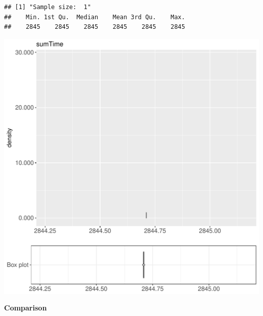 \documentclass{article}\usepackage[]{graphicx}\usepackage[]{color}
\makeatletter
\def\maxwidth{ %
  \ifdim\Gin@nat@width>\linewidth
    \linewidth
  \else
    \Gin@nat@width
  \fi
}
\newenvironment{kframe}{%
 \def\at@end@of@kframe{}%
 \ifinner\ifhmode%
  \def\at@end@of@kframe{\end{minipage}}%
  \begin{minipage}{\columnwidth}%
 \fi\fi%
 \def\FrameCommand##1{\hskip\@totalleftmargin \hskip-\fboxsep
 \colorbox{shadecolor}{##1}\hskip-\fboxsep
     \hskip-\linewidth \hskip-\@totalleftmargin \hskip\columnwidth}%
 \MakeFramed {\advance\hsize-\width
   \@totalleftmargin\z@ \linewidth\hsize
   \@setminipage}}%
 {\par\unskip\endMakeFramed%
 \at@end@of@kframe}
\newenvironment{knitrout}{}{} %
\makeatother
\begin{document}
\begin{knitrout}
\color{fgcolor}\begin{kframe}
\begin{verbatim}
## [1] "Sample size:  1"
##    Min. 1st Qu.  Median    Mean 3rd Qu.    Max. 
##    2845    2845    2845    2845    2845    2845
\end{verbatim}


{\ttfamily\noindent\bfseries{}}\end{kframe}
\includegraphics[width=\maxwidth]{figure/RH2_trivialcaching_obscure-1} 

\end{knitrout}
  
 \textbf{Comparison}
  
\end{document}
